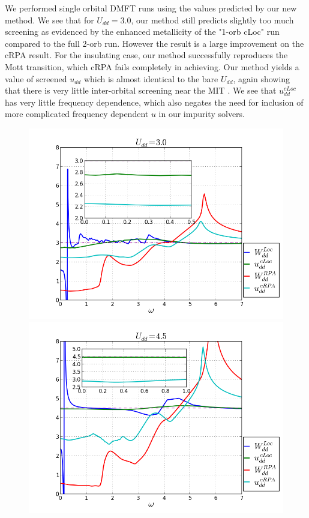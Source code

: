 \documentclass[10pt]{ruthesis}
\begin{document}
{We performed single orbital DMFT runs using the values predicted by our new method. We see that for $U_{dd}=3.0$, our method still predicts slightly too much screening as evidenced by the enhanced metallicity of the "1-orb cLoc" run compared to the full 2-orb run. However the result is a large improvement on the cRPA result. For the insulating case, our method successfully reproduces the Mott transition, which cRPA fails completely in achieving. Our method yields a value of screened $u_{dd}$ which is almost identical to the bare $U_{dd}$, again showing that there is very little inter-orbital screening near the MIT . We see that $u^{cLoc}_{dd}$ has very little frequency dependence, which also negates the need for inclusion of more complicated frequency dependent $u$ in our impurity solvers.

\begin{figure}[th]
 \includegraphics[width=\columnwidth]{./plotForpublishing/ExactWUrpaWU/tbUdd3.png}
 \includegraphics[width=\columnwidth]{./plotForpublishing/ExactWUrpaWU/tbUdd4p5.png}

\end{figure}}
\end{document}
